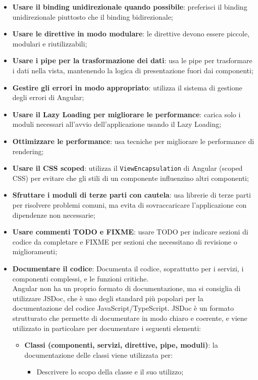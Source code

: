 \begin{itemize}
    \item \textbf{Usare il binding unidirezionale quando possibile}: preferisci il binding unidirezionale piuttosto che il binding bidirezionale;
    \item \textbf{Usare le direttive in modo modulare}: le direttive devono essere piccole, modulari e riutilizzabili;
    \item \textbf{Usare i pipe per la trasformazione dei dati}: usa le pipe per trasformare i dati nella vista, mantenendo la logica di presentazione fuori dai componenti;
    \item \textbf{Gestire gli errori in modo appropriato}: utilizza il sistema di gestione degli errori di Angular;
    \item \textbf{Usare il Lazy Loading per migliorare le performance}: carica solo i moduli necessari all’avvio dell’applicazione usando il Lazy Loading;
    \item \textbf{Ottimizzare le performance}: usa tecniche per migliorare le performance di rendering;
    \item \textbf{Usare il CSS scoped}: utilizza il \texttt{ViewEncapsulation} di Angular (scoped CSS) per evitare che gli stili di un componente influenzino altri componenti;
    \item \textbf{Sfruttare i moduli di terze parti con cautela}: usa librerie di terze parti per risolvere problemi comuni, ma evita di sovraccaricare l'applicazione con dipendenze non necessarie;
    \item \textbf{Usare commenti TODO e FIXME}: usare TODO per indicare sezioni di codice da completare e FIXME per sezioni che necessitano di revisione o miglioramenti;
    \item \textbf{Documentare il codice}: Documenta il codice, soprattutto per i servizi, i componenti complessi, e le funzioni critiche. \\ Angular non ha un proprio formato di documentazione, ma si consiglia di utilizzare JSDoc, che è uno degli standard più popolari per la documentazione del codice JavaScript/TypeScript. JSDoc è un formato strutturato che permette di documentare in modo chiaro e coerente, e viene utilizzato in particolare per documentare i seguenti elementi:
    \begin{itemize}
        \item \textbf{Classi (componenti, servizi, direttive, pipe, moduli)}: la documentazione delle classi viene utilizzata per:
        \begin{itemize}
            \item Descrivere lo scopo della classe e il suo utilizzo;

\end{itemize}
\end{itemize}
\end{itemize}
